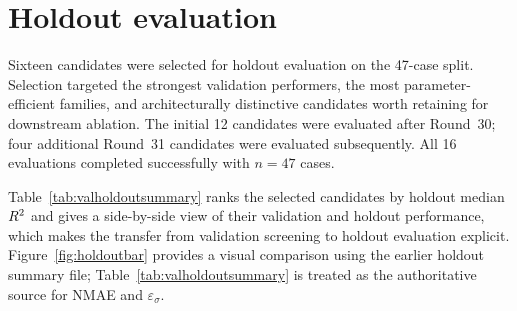 ﻿\documentclass[preprint,12pt,authoryear]{elsarticle}
\newcommand{\rTwo}{R\textsuperscript{2}}
\begin{document}
\section{Holdout evaluation}
\label{sec:holdout}

Sixteen candidates were selected for holdout evaluation on the 47-case split.
Selection targeted the strongest validation performers, the most parameter-efficient families, and architecturally distinctive candidates worth retaining for downstream ablation.
The initial 12 candidates were evaluated after Round~30; four additional Round~31 candidates were evaluated subsequently.
All 16 evaluations completed successfully with $n = 47$ cases.

Table~\ref{tab:valholdoutsummary} ranks the selected candidates by holdout median $\rTwo{}$ and gives a side-by-side view of their validation and holdout performance, which makes the transfer from validation screening to holdout evaluation explicit.
Figure~\ref{fig:holdoutbar} provides a visual comparison using the earlier holdout summary file; Table~\ref{tab:valholdoutsummary} is treated as the authoritative source for NMAE and $\varepsilon_{\sigma}$.
\end{document}
